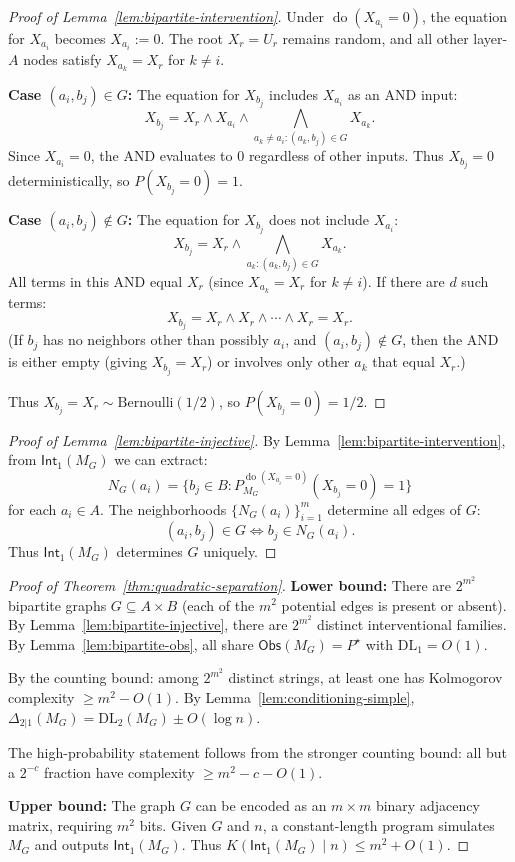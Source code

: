 \documentclass{article}
\theoremstyle{plain}
\theoremstyle{definition}
\newcommand{\Obs}{\mathsf{Obs}}
\newcommand{\Int}{\mathsf{Int}}
\newcommand{\DL}{\mathrm{DL}}
\DeclareMathOperator{\doop}{do}
\begin{document}
\begin{proof}[Proof of Lemma~\ref{lem:bipartite-intervention}]
Under $\doop(X_{a_i} = 0)$, the equation for $X_{a_i}$ becomes $X_{a_i} := 0$. The root $X_r = U_r$ remains random, and all other layer-$A$ nodes satisfy $X_{a_k} = X_r$ for $k \neq i$.

\textbf{Case $(a_i, b_j) \in G$:} The equation for $X_{b_j}$ includes $X_{a_i}$ as an AND input:
\[
X_{b_j} = X_r \wedge X_{a_i} \wedge \bigwedge_{a_k \neq a_i : (a_k, b_j) \in G} X_{a_k}.
\]
Since $X_{a_i} = 0$, the AND evaluates to $0$ regardless of other inputs. Thus $X_{b_j} = 0$ deterministically, so $P(X_{b_j} = 0) = 1$.

\textbf{Case $(a_i, b_j) \notin G$:} The equation for $X_{b_j}$ does not include $X_{a_i}$:
\[
X_{b_j} = X_r \wedge \bigwedge_{a_k : (a_k, b_j) \in G} X_{a_k}.
\]
All terms in this AND equal $X_r$ (since $X_{a_k} = X_r$ for $k \neq i$). If there are $d$ such terms:
\[
X_{b_j} = X_r \wedge X_r \wedge \cdots \wedge X_r = X_r.
\]
(If $b_j$ has no neighbors other than possibly $a_i$, and $(a_i, b_j) \notin G$, then the AND is either empty (giving $X_{b_j} = X_r$) or involves only other $a_k$ that equal $X_r$.)

Thus $X_{b_j} = X_r \sim \mathrm{Bernoulli}(1/2)$, so $P(X_{b_j} = 0) = 1/2$.
\end{proof}

\begin{proof}[Proof of Lemma~\ref{lem:bipartite-injective}]
By Lemma~\ref{lem:bipartite-intervention}, from $\Int_1(M_G)$ we can extract:
\[
N_G(a_i) = \{b_j \in B : P_{M_G}^{\doop(X_{a_i} = 0)}(X_{b_j} = 0) = 1\}
\]
for each $a_i \in A$. The neighborhoods $\{N_G(a_i)\}_{i=1}^m$ determine all edges of $G$:
\[
(a_i, b_j) \in G \iff b_j \in N_G(a_i).
\]
Thus $\Int_1(M_G)$ determines $G$ uniquely.
\end{proof}

\begin{proof}[Proof of Theorem~\ref{thm:quadratic-separation}]
\textbf{Lower bound:} There are $2^{m^2}$ bipartite graphs $G \subseteq A \times B$ (each of the $m^2$ potential edges is present or absent). By Lemma~\ref{lem:bipartite-injective}, there are $2^{m^2}$ distinct interventional families. By Lemma~\ref{lem:bipartite-obs}, all share $\Obs(M_G) = P^\star$ with $\DL_1 = O(1)$.

By the counting bound: among $2^{m^2}$ distinct strings, at least one has Kolmogorov complexity $\geq m^2 - O(1)$. By Lemma~\ref{lem:conditioning-simple}, $\Delta_{2|1}(M_G) = \DL_2(M_G) \pm O(\log n)$.

The high-probability statement follows from the stronger counting bound: all but a $2^{-c}$ fraction have complexity $\geq m^2 - c - O(1)$.

\textbf{Upper bound:} The graph $G$ can be encoded as an $m \times m$ binary adjacency matrix, requiring $m^2$ bits. Given $G$ and $n$, a constant-length program simulates $M_G$ and outputs $\Int_1(M_G)$. Thus $K(\Int_1(M_G) \mid n) \leq m^2 + O(1)$.
\end{proof}
\end{document}

